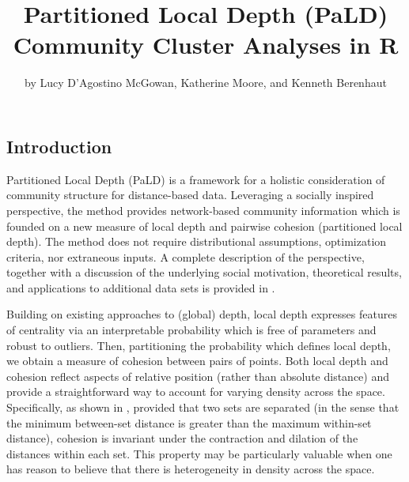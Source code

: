 \title{Partitioned Local Depth (PaLD) Community Cluster Analyses in R}
\author{by Lucy D'Agostino McGowan, Katherine Moore, and Kenneth Berenhaut}

\maketitle


\hypertarget{introduction}{%
\subsection{Introduction}\label{introduction}}

Partitioned Local Depth (PaLD) is a framework for a holistic
consideration of community structure for distance-based data. Leveraging
a socially inspired perspective, the method provides network-based
community information which is founded on a new measure of local depth
and pairwise cohesion (partitioned local depth). The method does not
require distributional assumptions, optimization criteria, nor
extraneous inputs. A complete description of the perspective, together
with a discussion of the underlying social motivation, theoretical
results, and applications to additional data sets is provided in
\citet{berenhaut2022social}.

Building on existing approaches to (global) depth, local depth expresses
features of centrality via an interpretable probability which is free of
parameters and robust to outliers. Then, partitioning the probability
which defines local depth, we obtain a measure of cohesion between pairs
of points. Both local depth and cohesion reflect aspects of relative
position (rather than absolute distance) and provide a straightforward
way to account for varying density across the space. Specifically, as
shown in \citet{berenhaut2022social}, provided that two sets are
separated (in the sense that the minimum between-set distance is greater
than the maximum within-set distance), cohesion is invariant under the
contraction and dilation of the distances within each set. This property
may be particularly valuable when one has reason to believe that there
is heterogeneity in density across the space.

